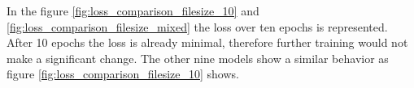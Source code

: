 \noindent
In the figure \ref{fig:loss_comparison_filesize_10} and \ref{fig:loss_comparison_filesize_mixed} the loss over ten epochs is represented. After 10 epochs the loss is already minimal, therefore further training would not make a significant change. The other nine models show a similar behavior as figure \ref{fig:loss_comparison_filesize_10} shows.


\printbibliography

